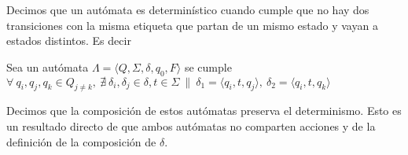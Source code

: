 \begin{definition}[Determinismo] Decimos que un autómata es determinístico cuando cumple que no hay dos transiciones con la misma etiqueta que partan de un mismo estado y vayan a estados distintos. Es decir 

\begin{centering}
Sea un autómata $ \Lambda = \langle Q, \Sigma, \delta, q_0, F \rangle$ se cumple
$ \forall \  q_i, q_j, q_k \in Q_{j \neq k}, \  \nexists \ \delta_i, \delta_j \in \delta, t \in \Sigma \ \| \  \delta_1 = \langle q_i, t, q_j \rangle, \ \delta_2 = \langle q_i, t, q_k \rangle$ \\
\end{centering} 

Decimos que la composición de estos autómatas preserva el determinismo. Esto es un resultado directo de que ambos autómatas no comparten acciones y de la definición de la composición de $\delta$.

\end{definition}



